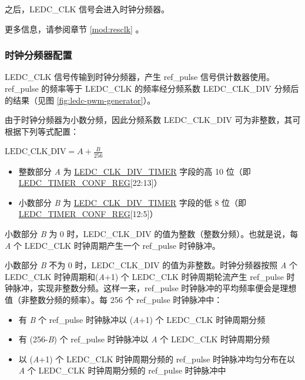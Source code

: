 \documentclass[main\_\_CN.tex]{subfiles}
\begin{document}
之后，LEDC\_CLK 信号会进入时钟分频器。

更多信息，请参阅章节 \ref{mod:resclk} \textit{}。

\subsubsection{时钟分频器配置}

LEDC\_CLK 信号传输到时钟分频器，产生 ref\_pulse 信号供计数器使用。ref\_pulse 的频率等于 LEDC\_CLK 的频率经分频系数 LEDC\_CLK\_DIV 分频后的结果（见图 \ref{fig:ledc-pwm-generator}）。

由于时钟分频器为小数分频，因此分频系数 LEDC\_CLK\_DIV 可为非整数，其可根据下列等式配置：

\begin{center}
$\textrm{LEDC\_CLK\_DIV}= A + \frac{B}{256}$
\end{center}

\begin{itemize}
    \item 整数部分 \textit{A} 为 \hyperref[fielddesc:LEDCCLKDIVTIMERN]{LEDC\_CLK\_DIV\_TIMER} 字段的高 10 位（即 \hyperref[regdesc:LEDCTIMERNCONFREG]{LEDC\_TIMER\_CONF\_REG}[22:13]）
    \item 小数部分 \textit{B} 为 \hyperref[fielddesc:LEDCCLKDIVTIMERN]{LEDC\_CLK\_DIV\_TIMER} 字段的低 8 位（即 \hyperref[regdesc:LEDCTIMERNCONFREG]{LEDC\_TIMER\_CONF\_REG}[12:5]）
\end{itemize}

小数部分 \textit{B} 为 0 时，LEDC\_CLK\_DIV 的值为整数（整数分频）。也就是说，每 \textit{A} 个 LEDC\_CLK 时钟周期产生一个 ref\_pulse 时钟脉冲。

小数部分 \textit{B} 不为 0 时，LEDC\_CLK\_DIV 的值为非整数。时钟分频器按照 \textit{A} 个 LEDC\_CLK 时钟周期和(\textit{A}+1) 个 LEDC\_CLK 时钟周期轮流产生 ref\_pulse 时钟脉冲，实现非整数分频。这样一来，ref\_pulse 时钟脉冲的平均频率便会是理想值（非整数分频的频率）。每 256 个 ref\_pulse 时钟脉冲中：

\begin{itemize}
    \item 有 \textit{B} 个 ref\_pulse 时钟脉冲以 (\textit{A}+1) 个 LEDC\_CLK 时钟周期分频
    \item 有 (256-\textit{B}) 个 ref\_pulse 时钟脉冲以 \textit{A} 个 LEDC\_CLK 时钟周期分频
    \item 以 (\textit{A}+1) 个 LEDC\_CLK 时钟周期分频的 ref\_pulse 时钟脉冲均匀分布在以 \textit{A} 个 LEDC\_CLK 时钟周期分频的 ref\_pulse 时钟脉冲中
\end{itemize}
\end{document}

